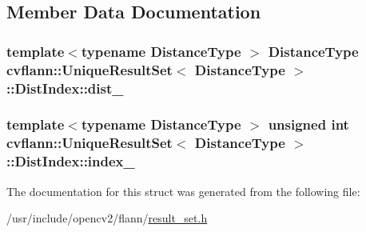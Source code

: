 \subsection{Member Data Documentation}
\hypertarget{structcvflann_1_1UniqueResultSet_1_1DistIndex_a844fa1a0eb8644069bca6c4a4e285e24}{
\subsubsection[{dist\-\_\-}]{\setlength{\rightskip}{0pt plus 5cm}template$<$typename Distance\-Type $>$ Distance\-Type {\bf cvflann\-::\-Unique\-Result\-Set}$<$ Distance\-Type $>$\-::Dist\-Index\-::dist\-\_\-}}\label{structcvflann_1_1UniqueResultSet_1_1DistIndex_a844fa1a0eb8644069bca6c4a4e285e24}
\hypertarget{structcvflann_1_1UniqueResultSet_1_1DistIndex_af78cbee8bf5dd4249adbf52674022178}{
\subsubsection[{index\-\_\-}]{\setlength{\rightskip}{0pt plus 5cm}template$<$typename Distance\-Type $>$ unsigned int {\bf cvflann\-::\-Unique\-Result\-Set}$<$ Distance\-Type $>$\-::Dist\-Index\-::index\-\_\-}}\label{structcvflann_1_1UniqueResultSet_1_1DistIndex_af78cbee8bf5dd4249adbf52674022178}


The documentation for this struct was generated from the following file\-:\begin{DoxyCompactItemize}
\item 
/usr/include/opencv2/flann/\hyperlink{result__set_8h}{result\-\_\-set.\-h}\end{DoxyCompactItemize}
